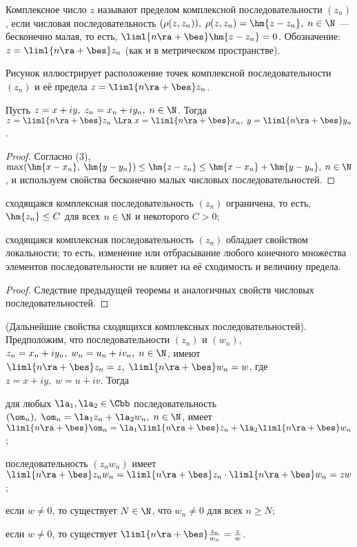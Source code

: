 \documentclass[a4paper]{article}
\newenvironment{imp*}{\par\vskip\theoremskip\textbf{Следствие.}\normalfont \itshape}{\par\vskip\theoremskip}
\begin{document}
\begin{df}
Комплексное число $z$ называют пределом комплексной
последовательности $(z_n)$, если числовая последовательность
$(\rho(z,z_n)), \; \rho(z,z_n) = \hm{z-z_n}, \; n\in\N$ ---
бесконечно малая, то есть, $\liml{n\ra+\bes} \hm{z-z_n}=0$.
Обозначение: $z=\liml{n\ra+\bes}z_n$ (как и в метрическом
пространстве).
\end{df}

Рисунок иллюстрирует расположение точек комплексной
последовательности $(z_n)$ и её предела $z=\liml{n\ra+\bes}z_n$.

\begin{theorem}\label{thm1.34}
Пусть $z=x+iy, \; z_n = x_n+iy_n, \; n\in\N$. Тогда
$z=\liml{n\ra+\bes} z_n \; \Lra \; x=\liml{n\ra+\bes} x_n, \;
y=\liml{n\ra+\bes} y_n$.
\end{theorem}

\begin{proof}
Согласно (3), $\max(\hm{x-x_n}, \; \hm{y-y_n}) \le \hm{z-z_n} \le
\hm{x-x_n} + \hm{y-y_n}, \; n\in\N$, и используем свойства
бесконечно малых числовых последовательностей.
\end{proof}

\begin{imp*}
\begin{nums}{-2}
\item сходящаяся комплексная последовательность $(z_n)$ ограничена,
то есть, $\hm{z_n}\le C$ для всех $n\in\N$ и некоторого $C>0$;
\item сходящаяся комплексная последовательность $(z_n)$ обладает
свойством локальности; то есть, изменение или отбрасывание любого
конечного множества элементов последовательности не влияет на её
сходимость и величину предела.
\end{nums}
\end{imp*}

\begin{proof}
Следствие предыдущей теоремы и аналогичных свойств числовых
последовательностей.
\end{proof}

\begin{theorem}
(Дальнейшие свойства сходящихся комплексных последовательностей).
Предположим, что последовательности $(z_n)$ и $(w_n)$,
$z_n=x_n+iy_n, \; w_n=u_n+iv_n, \; n\in\N$, имеют
$\liml{n\ra+\bes}z_n=z, \; \liml{n\ra+\bes}w_n=w$, где $z=x+iy, \;
w=u+iv$. Тогда
\begin{nums}{-2}
\item для любых $\la_1,\la_2\in\Cbb$ последовательность $(\om_n), \;
\om_n=\la_1z_n+\la_2w_n, \; n\in\N$, имеет
$\liml{n\ra+\bes}\om_n=\la_1\liml{n\ra+\bes}z_n +
\la_2\liml{n\ra+\bes}w_n$;
\item последовательность $(z_nw_n)$ имеет
$\liml{n\ra+\bes}z_nw_n=\liml{n\ra+\bes}z_n\cdot\liml{n\ra+\bes}w_n=zw$;
\item если $w\ne0$, то существует $N\in\N$, что $w_n\ne0$ для всех
$n\ge N$;
\item если $w\ne0$, то существует
$\liml{n\ra+\bes}\frac{z_n}{w_n}=\frac{z}{w}$.
\end{nums}
\end{theorem}
\end{document}
